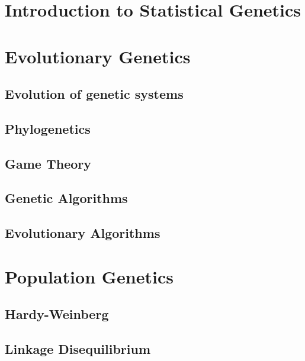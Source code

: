 \documentclass[12pt,]{krantz}
\theoremstyle{definition}
\theoremstyle{definition}
\theoremstyle{remark}
\begin{document}
\mainmatter

\chapter{Introduction to Statistical
Genetics}\label{introduction-to-statistical-genetics}

\chapter{Evolutionary Genetics}\label{evolutionary-genetics}

\section{Evolution of genetic
systems}\label{evolution-of-genetic-systems}

\section{Phylogenetics}\label{phylogenetics}

\section{Game Theory}\label{game-theory}

\section{Genetic Algorithms}\label{genetic-algorithms}

\section{Evolutionary Algorithms}\label{evolutionary-algorithms}

\chapter{Population Genetics}\label{population-genetics}

\section{Hardy-Weinberg}\label{hardy-weinberg}

\section{Linkage Disequilibrium}\label{linkage-disequilibrium}
\end{document}
